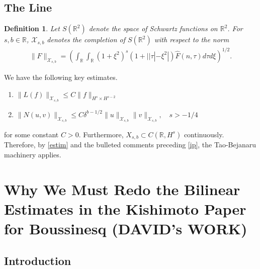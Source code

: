 \documentclass{amsart}
\newtheorem{definition}[theorem]{Definition}
\newcommand{\rr}{\mathbb{R}}
\newcommand{\wh}{\widehat}
\begin{document}
\subsection{The Line} 
\begin{definition}
  Let $S(\rr^{2})$ denote the space of Schwartz functions on
  $\rr^{2}$.  For $s, b \in \rr$, $\mathcal{X}_{s,b}$
  denotes the completion of $S(\rr^{2})$ with
  respect to the norm
  \begin{equation}
  \begin{split}
    \|F\|_{\mathcal{X}_{s,b}} = \left( \int_{\rr} \int_{\rr} (1 + \xi^{2})^{s}
    (1 + | | \tau | - \xi^{2} |) \wh{F}(n, \tau) d \tau d \xi \right)^{1/2}.
  \end{split}
  \label{eqn:bous-norm-real}
  \end{equation}
  \end{definition}
We have the following key estimates.
%
\begin{enumerate}
  \item{$\|L(f)\|_{\mathcal{X}_{s,b}} \le C \| f \|_{H^s \times H^{s-2}}$}
  \item{$\| N(u, v) \|_{\mathcal{X}_{s,b}} \le C \delta^{b - 1/2} \| u \|_{\mathcal{X}_{s,b}} \| v \|_{\mathcal{X}_{s,b}}, \quad s > -1/4$} 
\end{enumerate}
for some constant $C > 0$. Furthermore, $X_{s,b} \subset C(\rr, H^{s})$
continuously. Therefore, by \eqref{estim} and the bulleted comments preceding
\eqref{ip}, the Tao-Bejanaru machinery applies.

\section{Why We Must Redo the Bilinear Estimates in the
    Kishimoto Paper for Boussinesq (DAVID's WORK)}
\subsection{Introduction} 
\end{document}
